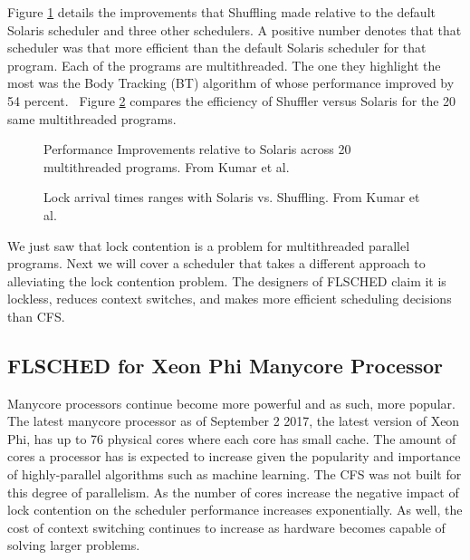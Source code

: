 \documentclass{sig-alternate}
\begin{document}
Figure \ref{fig:shuf_performance} details the improvements that Shuffling made relative to the default Solaris scheduler and three other schedulers. A positive number denotes that that scheduler was that more efficient than the default Solaris scheduler for that program. Each of the programs are multithreaded. The one they highlight the most was the Body Tracking (BT) algorithm of whose performance improved by 54 percent.~\cite{KumarEtal:2014} Figure \ref{fig:shuf_vs_solaris} compares the efficiency of Shuffler versus Solaris for the 20 same multithreaded programs.
\begin{figure}
\centering
{}
\caption{Performance Improvements relative to Solaris across 20 multithreaded programs. From Kumar et al.~\cite{KumarEtal:2014}}
\label{fig:shuf_performance}
\end{figure}

\begin{figure}
\centering
{}
\caption{Lock arrival times ranges with Solaris vs. Shuffling. From Kumar et al.~\cite{KumarEtal:2014}}
\label{fig:shuf_vs_solaris}
\end{figure}

We just saw that lock contention is a problem for multithreaded parallel programs. Next we will cover a scheduler that takes a different approach to alleviating the lock contention problem. The designers of FLSCHED claim it is lockless, reduces context switches, and makes more efficient scheduling decisions than CFS.~\cite{JoEtal:2017}

\subsection{FLSCHED for Xeon Phi Manycore Processor}
\label{sec:flsched}

Manycore processors continue become more powerful and as such, more popular. The latest manycore processor as of September 2 2017, the latest version of Xeon Phi, has up to 76 physical cores where each core has small cache. The amount of cores a processor has is expected to increase given the popularity and importance of highly-parallel algorithms such as machine learning. The CFS was not built for this degree of parallelism. As the number of cores increase the negative impact of lock contention on the scheduler performance increases exponentially. As well, the cost of context switching continues to increase as hardware becomes capable of solving larger problems.
\end{document}
